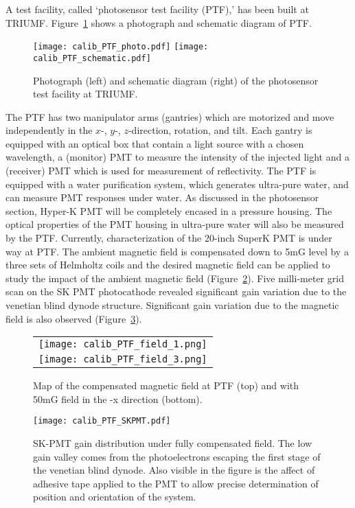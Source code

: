 A test facility, called `photosensor test facility (PTF),' has been
built at TRIUMF.  Figure~\ref{fig:calib_PTF} shows a photograph and
schematic diagram of PTF.
%
\begin{figure}[htbp]
  \begin{center}
  \texttt{[image: calib\_PTF\_photo.pdf]}
  \texttt{[image: calib\_PTF\_schematic.pdf]}
  \caption{Photograph (left) and schematic diagram (right) of the photosensor test facility
    at TRIUMF.}
  \label{fig:calib_PTF}
  \end{center}
\end{figure}
%
The PTF has two manipulator arms (gantries) which are motorized and
move independently in the $x$-, $y$-, $z$-direction, rotation, and
tilt.  Each gantry is equipped with an optical box that contain a
light source with a chosen wavelength, a (monitor) PMT to measure the
intensity of the injected light and a (receiver) PMT which is used for
measurement of reflectivity.  The PTF is equipped with a water
purification system, which generates ultra-pure water, and can measure
PMT responses under water.
%
As discussed in the photosensor section, Hyper-K PMT will be
completely encased in a pressure housing.  The optical properties of
the PMT housing in ultra-pure water will also be measured by the PTF.
%
Currently, characterization of the 20-inch SuperK PMT is under way at PTF.
The ambient magnetic field is compensated down to 5mG level by a three sets
of Helmholtz coils and the desired magnetic field can be applied to study the
impact of the ambient magnetic field (Figure~\ref{fig:PTF_field}). Five milli-meter grid 
scan on the SK PMT photocathode revealed significant gain variation due to the 
venetian blind dynode structure. Significant gain variation due to the magnetic field 
is also observed (Figure~\ref{fig:SKPMT_PTF}). 
%
\begin{figure}[htbp]
  \begin{center}
  \begin{tabular}{c}
  \texttt{[image: calib\_PTF\_field\_1.png]} \\
  \texttt{[image: calib\_PTF\_field\_3.png]} \\
  \end{tabular}
  \caption{Map of the compensated magnetic field at PTF (top) and 
 with 50mG field in the -x direction  (bottom).}
  \label{fig:PTF_field}
  \end{center}
\end{figure}
%
%
\begin{figure}[htbp]
  \begin{center}
  \texttt{[image: calib\_PTF\_SKPMT.pdf]}
  \caption{SK-PMT gain distribution under fully compensated field. The low gain valley
  comes from the photoelectrons escaping the first stage of the venetian blind dynode. 
  Also visible in the figure is the affect of adhesive tape applied to the PMT to allow 
  precise determination of position and orientation of the system.}
  \label{fig:SKPMT_PTF}
  \end{center}
\end{figure}
%

